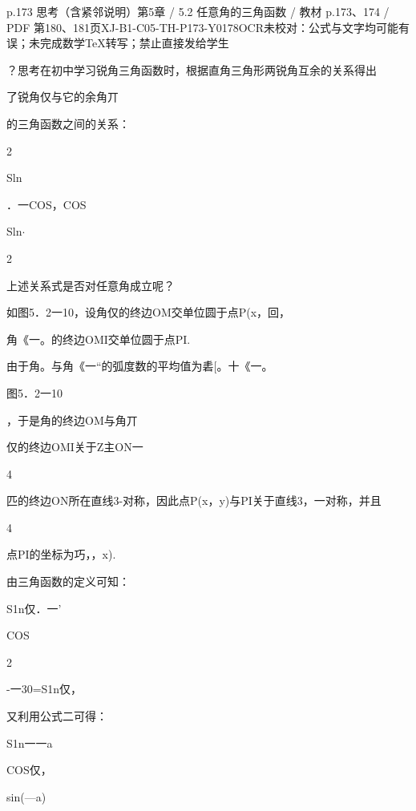 \begin{bankitem}{p.173 思考（含紧邻说明）}{第5章 / 5.2 任意角的三角函数 / 教材 p.173、174 / PDF 第180、181页}{XJ-B1-C05-TH-P173-Y0178}{OCR未校对：公式与文字均可能有误；未完成数学TeX转写；禁止直接发给学生}
\begin{ocrdraft}
\par
？思考在初中学习锐角三角函数时，根据直角三角形两锐角互余的关系得出
\par
了锐角仅与它的余角丌
\par
的三角函数之间的关系：
\par
2
\par
Sln
\par
．一COS，COS
\par
Sln\ensuremath{\cdot}
\par
2
\par
上述关系式是否对任意角成立呢？
\par
如图5．2一10，设角仅的终边OM交单位圆于点P(x，回，
\par
角《一。的终边OMI交单位圆于点PI.
\par
由于角。与角《一“的弧度数的平均值为砉[。十《一。
\par
图5．2一10
\par
，于是角的终边OM与角丌
\par
仅的终边OMI关于Z主ON一
\par
4
\par
匹的终边ON所在直线3-对称，因此点P(x，y)与PI关于直线3，一对称，并且
\par
4
\par
点PI的坐标为巧，，x).
\par
由三角函数的定义可知：
\par
S1n仅．一'
\par
COS
\par
2
\par
-一30=S1n仅，
\par
又利用公式二可得：
\par
S1n一一a
\par
COS仅，
\par
{}sin(—a)

\end{ocrdraft}
\end{bankitem}

